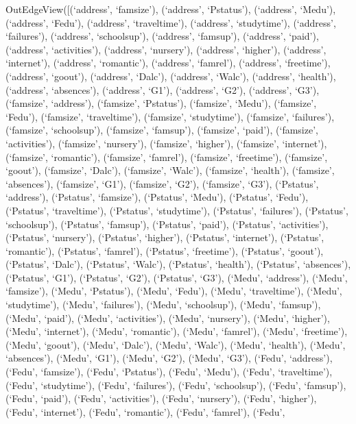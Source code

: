 \documentclass[
]{article}
\begin{document}
OutEdgeView({[}(`address', `famsize'), (`address', `Pstatus'),
(`address', `Medu'), (`address', `Fedu'), (`address', `traveltime'),
(`address', `studytime'), (`address', `failures'), (`address',
`schoolsup'), (`address', `famsup'), (`address', `paid'), (`address',
`activities'), (`address', `nursery'), (`address', `higher'),
(`address', `internet'), (`address', `romantic'), (`address', `famrel'),
(`address', `freetime'), (`address', `goout'), (`address', `Dalc'),
(`address', `Walc'), (`address', `health'), (`address', `absences'),
(`address', `G1'), (`address', `G2'), (`address', `G3'), (`famsize',
`address'), (`famsize', `Pstatus'), (`famsize', `Medu'), (`famsize',
`Fedu'), (`famsize', `traveltime'), (`famsize', `studytime'),
(`famsize', `failures'), (`famsize', `schoolsup'), (`famsize',
`famsup'), (`famsize', `paid'), (`famsize', `activities'), (`famsize',
`nursery'), (`famsize', `higher'), (`famsize', `internet'), (`famsize',
`romantic'), (`famsize', `famrel'), (`famsize', `freetime'), (`famsize',
`goout'), (`famsize', `Dalc'), (`famsize', `Walc'), (`famsize',
`health'), (`famsize', `absences'), (`famsize', `G1'), (`famsize',
`G2'), (`famsize', `G3'), (`Pstatus', `address'), (`Pstatus',
`famsize'), (`Pstatus', `Medu'), (`Pstatus', `Fedu'), (`Pstatus',
`traveltime'), (`Pstatus', `studytime'), (`Pstatus', `failures'),
(`Pstatus', `schoolsup'), (`Pstatus', `famsup'), (`Pstatus', `paid'),
(`Pstatus', `activities'), (`Pstatus', `nursery'), (`Pstatus',
`higher'), (`Pstatus', `internet'), (`Pstatus', `romantic'), (`Pstatus',
`famrel'), (`Pstatus', `freetime'), (`Pstatus', `goout'), (`Pstatus',
`Dalc'), (`Pstatus', `Walc'), (`Pstatus', `health'), (`Pstatus',
`absences'), (`Pstatus', `G1'), (`Pstatus', `G2'), (`Pstatus', `G3'),
(`Medu', `address'), (`Medu', `famsize'), (`Medu', `Pstatus'), (`Medu',
`Fedu'), (`Medu', `traveltime'), (`Medu', `studytime'), (`Medu',
`failures'), (`Medu', `schoolsup'), (`Medu', `famsup'), (`Medu',
`paid'), (`Medu', `activities'), (`Medu', `nursery'), (`Medu',
`higher'), (`Medu', `internet'), (`Medu', `romantic'), (`Medu',
`famrel'), (`Medu', `freetime'), (`Medu', `goout'), (`Medu', `Dalc'),
(`Medu', `Walc'), (`Medu', `health'), (`Medu', `absences'), (`Medu',
`G1'), (`Medu', `G2'), (`Medu', `G3'), (`Fedu', `address'), (`Fedu',
`famsize'), (`Fedu', `Pstatus'), (`Fedu', `Medu'), (`Fedu',
`traveltime'), (`Fedu', `studytime'), (`Fedu', `failures'), (`Fedu',
`schoolsup'), (`Fedu', `famsup'), (`Fedu', `paid'), (`Fedu',
`activities'), (`Fedu', `nursery'), (`Fedu', `higher'), (`Fedu',
`internet'), (`Fedu', `romantic'), (`Fedu', `famrel'), (`Fedu',
\end{document}
